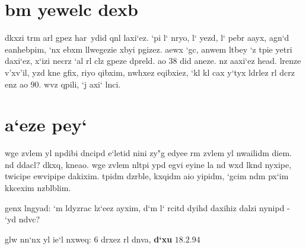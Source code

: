 \pagestyle{empty}

\sethebrew
\section{bm yewelc dexb}

dkxzi trm arl \openquote gpez har\closequote\ ydid qnl laxi`ez.
\openquote `pi l` nryo, l` yezd, l` pebr aayx, agn`d eanhebpim\closequote,
`nx ebxm llwegezie xbyi pgizez. aewx `gc, anwem ltbey `z
tpie yetri daxi`ez, x`izi necrz `al rl clz gpeze dpreld. 
ao $38$ did aneze. nz aaxi`ez head. lrenze v'xv'il, yzd
kne gfix, riyo qibxim, nwhxez eqibxiez, `kl kl cax
y`tyx ldrlez rl dcrz enz ao $90$. wvz qpili, `j axi` lnci.

\section{a`eze pey`}

wge zvlem yl npdibi dncipd e`letid nini zy"g edyee rm
zvlem yl nwailidm diem. nd ddacl?
dkxq, kneao. wge zvlem nltpi ypd egvi eyine la nd wxd
lknd nyxipe, twicipe ewvipipe dakixim.
tpidm dzrble, kxqidm aio yipidm, `gcim ndm px`im
kkcexim nzblblim.

\medskip
genx lngyad: `m ldyzrac lz`eez ayxim, d`m l` rcitd dyihd
daxihiz dalzi nynipd - `yd ndvc?

\bigskip
glw nn`nx yl ie`l nxweq: \openquote $6$ drxez rl dnva\closequote, {\bf d`xu} $18.2.94$


